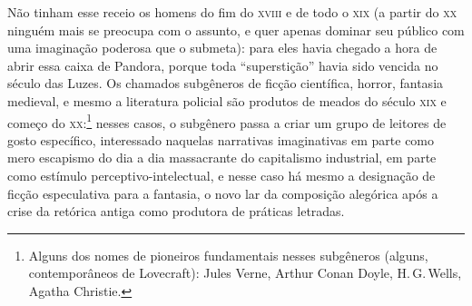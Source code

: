 Não tinham esse receio os homens do fim do \textsc{xviii} e de todo o \textsc{xix} (a
partir do \textsc{xx} ninguém mais se preocupa com o assunto, e quer apenas
dominar seu público com uma imaginação poderosa que o submeta): para
eles havia chegado a hora de abrir essa caixa de Pandora, porque toda
``superstição'' havia sido vencida no século das Luzes. Os chamados
subgêneros de ficção científica, horror,  fantasia
medieval, e mesmo a literatura policial são produtos de meados
do século \textsc{xix} e começo do \textsc{xx}:\footnote{Alguns dos nomes de pioneiros
  fundamentais nesses subgêneros (alguns, contemporâneos de Lovecraft):
  Jules Verne, Arthur Conan Doyle, H.\,G.\,Wells, Agatha Christie.} nesses casos, o subgênero
passa a criar um grupo de leitores de gosto específico, interessado
naquelas narrativas imaginativas em parte como mero escapismo do
dia a dia massacrante do capitalismo industrial, em parte como
estímulo perceptivo-intelectual, e nesse caso há mesmo a
designação de ficção especulativa para a fantasia, o novo lar da
composição alegórica após a crise da retórica antiga como produtora de
práticas letradas.

